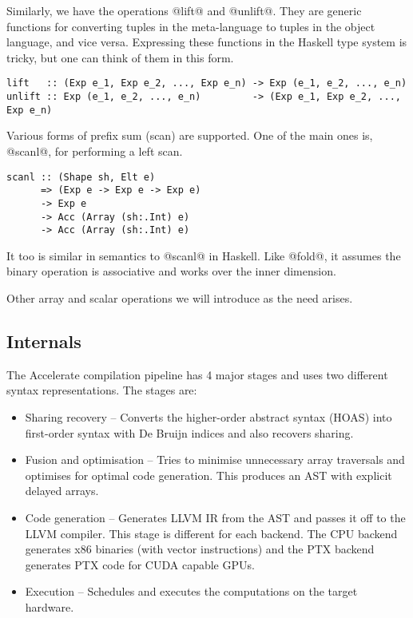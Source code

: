 Similarly, we have the operations @lift@ and @unlift@. They are generic functions for converting tuples in the meta-language to tuples in the object language, and vice versa. Expressing these functions in the Haskell type system is tricky, but one can think of them in this form.
%
\begin{lstlisting}[style=ndp]
lift   :: (Exp e_1, Exp e_2, ..., Exp e_n) -> Exp (e_1, e_2, ..., e_n)
unlift :: Exp (e_1, e_2, ..., e_n)         -> (Exp e_1, Exp e_2, ..., Exp e_n)
\end{lstlisting}
%

Various forms of prefix sum (scan) are supported. One of the main ones is, @scanl@, for performing a left scan.
%
\begin{lstlisting}
scanl :: (Shape sh, Elt e)
      => (Exp e -> Exp e -> Exp e)
      -> Exp e
      -> Acc (Array (sh:.Int) e)
      -> Acc (Array (sh:.Int) e)
\end{lstlisting}
%
It too is similar in semantics to @scanl@ in Haskell. Like @fold@, it assumes the binary operation is associative and works over the inner dimension.

Other array and scalar operations we will introduce as the need arises.


\subsection{Internals}
\label{sec:acc-internals}


The Accelerate compilation pipeline has 4 major stages and uses two different syntax representations. The stages are:
%
\begin{itemize}
%
\item Sharing recovery -- Converts the higher-order abstract syntax (HOAS) into first-order syntax with De Bruijn indices and also recovers sharing.
%
%
\item Fusion and optimisation -- Tries to minimise unnecessary array traversals and optimises for optimal code generation. This produces an AST with explicit delayed arrays.
%
\item Code generation -- Generates LLVM IR from the AST and passes it off to the LLVM compiler. This stage is different for each backend. The CPU backend generates x86 binaries (with vector instructions) and the PTX backend generates PTX code for CUDA capable GPUs.
%
\item Execution -- Schedules and executes the computations on the target hardware.
\end{itemize}
%

